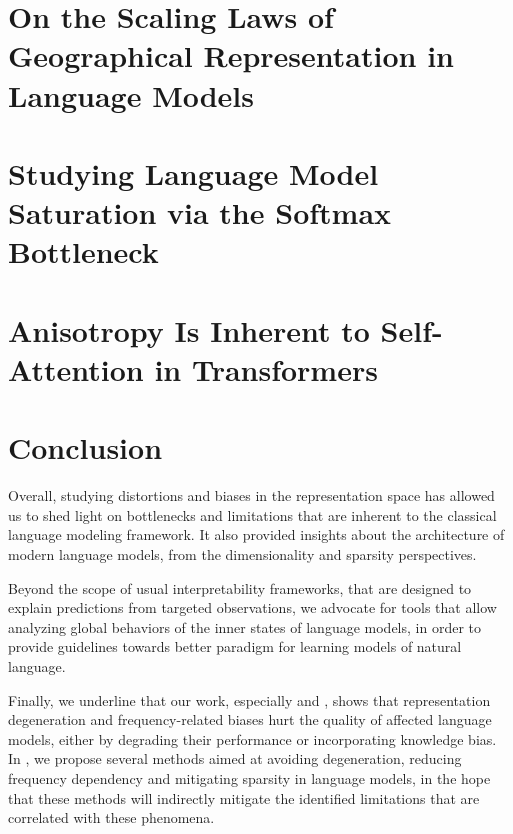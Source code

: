 
\chapter{On the Scaling Laws of Geographical Representation in Language Models}
\label{chap:geobias}


\chapter{Studying Language Model Saturation via the Softmax Bottleneck}
\label{chap:softmax_bottleneck}


\chapter{Anisotropy Is Inherent to Self-Attention in Transformers}
\label{chap:anisotropy}



\chapter*{Conclusion}

Overall, studying distortions and biases in the representation space has allowed us to shed light on bottlenecks and limitations that are inherent to the classical language modeling framework. It also provided insights about the architecture of modern language models, from the dimensionality and sparsity perspectives. 

Beyond the scope of usual interpretability frameworks, that are designed to explain predictions from targeted observations, we advocate for tools that allow analyzing global behaviors of the inner states of language models, in order to provide guidelines towards better paradigm for learning models of natural language.

Finally, we underline that our work, especially  and , shows that representation degeneration and frequency-related biases hurt the quality of affected language models, either by degrading their performance or incorporating knowledge bias. In , we propose several methods aimed at avoiding degeneration, reducing frequency dependency and mitigating sparsity in language models, in the hope that these methods will indirectly mitigate the identified limitations that are correlated with these phenomena.

% 
% 
% 
